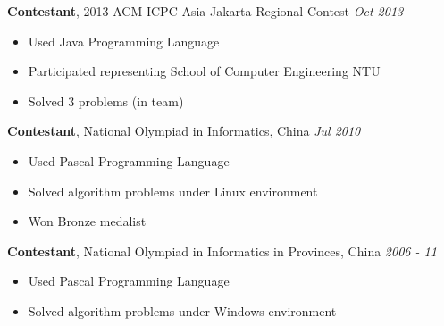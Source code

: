 \documentclass[a4paper, 12pt]{article}
\newenvironment{changemargin}[2]{%
  \begin{list}{}{%
      \setlength{\topsep}{0pt}%
      \setlength{\leftmargin}{#1}%
      \setlength{\rightmargin}{#2}%
      \setlength{\listparindent}{\parindent}%
      \setlength{\itemindent}{\parindent}%
      \setlength{\parsep}{\parskip}%
    }%
  \item[]}{\end{list}
}
\newenvironment{body}
{
\vspace*{-16pt}
\begin{changemargin}{-0.25in}{-0.5in}
}	
{
\end{changemargin}
}
\begin{document}
\begin{body}
  \textbf{Contestant}, {2013 ACM-ICPC Asia Jakarta Regional Contest} \hfill \emph{Oct 2013}\\
  \vspace*{-4pt}
  \begin{itemize} \itemsep -0pt  \small
  \item Used Java Programming Language
  \item Participated representing School of Computer Engineering NTU
  \item Solved 3 problems (in team)
  \end{itemize}
  
  \textbf {Contestant}, {National Olympiad in Informatics, China} \hfill \emph{Jul 2010}\\
  \vspace*{-4pt}
  \begin{itemize} \itemsep -0pt \small
  \item Used Pascal Programming Language
  \item Solved algorithm problems under Linux environment
  \item Won Bronze medalist
  \end{itemize}

  \textbf {Contestant}, {National Olympiad in Informatics in Provinces, China} \hfill \emph{2006 - 11}\\
  \vspace*{-4pt}
  \begin{itemize} \itemsep -0pt \small
  \item Used Pascal Programming Language
  \item Solved algorithm problems under Windows environment
  \end{itemize}
\end{body}
\end{document}

